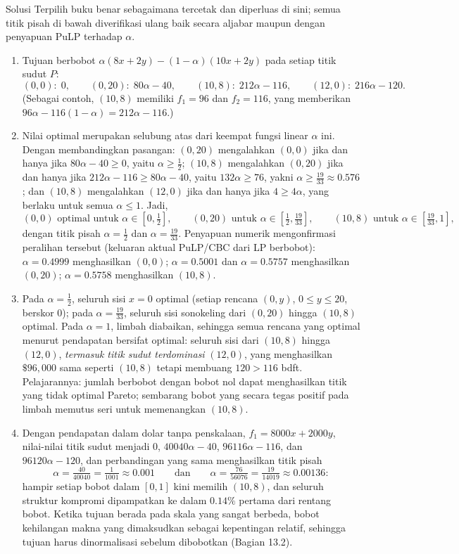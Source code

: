 Solusi Terpilih buku benar sebagaimana tercetak dan diperluas di sini;
semua titik pisah di bawah diverifikasi ulang baik secara aljabar maupun dengan
penyapuan PuLP terhadap $\alpha$.

\begin{enumerate}
\item Tujuan berbobot
$\alpha(8x + 2y) - (1-\alpha)(10x + 2y)$ pada setiap titik sudut $P$:
\[
(0,0): \; 0, \qquad
(0,20): \; 80\alpha - 40, \qquad
(10,8): \; 212\alpha - 116, \qquad
(12,0): \; 216\alpha - 120.
\]
(Sebagai contoh, $(10,8)$ memiliki $f_1 = 96$ dan $f_2 = 116$, yang memberikan
$96\alpha - 116(1 - \alpha) = 212\alpha - 116$.)
\item Nilai optimal merupakan selubung atas dari keempat fungsi linear
$\alpha$ ini. Dengan membandingkan pasangan: $(0,20)$ mengalahkan $(0,0)$ jika
dan hanya jika $80\alpha - 40 \geq 0$, yaitu $\alpha \geq \tfrac12$; $(10,8)$
mengalahkan $(0,20)$ jika dan hanya jika
$212\alpha - 116 \geq 80\alpha - 40$, yaitu $132\alpha \geq 76$, yakni
$\alpha \geq \tfrac{19}{33} \approx 0.576$; dan $(10,8)$ mengalahkan $(12,0)$
jika dan hanya jika $4 \geq 4\alpha$, yang berlaku untuk semua
$\alpha \leq 1$. Jadi,
\[
(0,0) \text{ optimal untuk } \alpha \in [0, \tfrac12], \qquad
(0,20) \text{ untuk } \alpha \in [\tfrac12, \tfrac{19}{33}], \qquad
(10,8) \text{ untuk } \alpha \in [\tfrac{19}{33}, 1],
\]
dengan titik pisah $\alpha = \tfrac12$ dan $\alpha = \tfrac{19}{33}$.
Penyapuan numerik mengonfirmasi peralihan tersebut (keluaran aktual PuLP/CBC
dari LP berbobot): $\alpha = 0.4999$ menghasilkan $(0,0)$;
$\alpha = 0.5001$ dan $\alpha = 0.5757$ menghasilkan $(0,20)$;
$\alpha = 0.5758$ menghasilkan $(10,8)$.
\item Pada $\alpha = \tfrac12$, seluruh sisi $x = 0$ optimal (setiap rencana
$(0, y)$, $0 \leq y \leq 20$, berskor $0$); pada
$\alpha = \tfrac{19}{33}$, seluruh sisi sonokeling dari $(0,20)$ hingga $(10,8)$
optimal. Pada $\alpha = 1$, limbah diabaikan, sehingga semua rencana yang
optimal menurut pendapatan bersifat optimal: seluruh sisi dari $(10,8)$ hingga
$(12,0)$, \emph{termasuk titik sudut terdominasi} $(12,0)$, yang menghasilkan
$\$96{,}000$ sama seperti $(10,8)$ tetapi membuang $120 > 116$ bdft. Pelajarannya:
jumlah berbobot dengan bobot nol dapat menghasilkan titik yang tidak optimal
Pareto; sembarang bobot yang secara tegas positif pada limbah memutus seri
untuk memenangkan $(10,8)$.
\item Dengan pendapatan dalam dolar tanpa penskalaan,
$f_1 = 8000x + 2000y$, nilai-nilai titik sudut menjadi $0$,
$40040\alpha - 40$, $96116\alpha - 116$, dan $96120\alpha - 120$, dan
perbandingan yang sama menghasilkan titik pisah
\[
\alpha = \tfrac{40}{40040} = \tfrac{1}{1001} \approx 0.001
\qquad\text{dan}\qquad
\alpha = \tfrac{76}{56076} = \tfrac{19}{14019} \approx 0.00136 :
\]
hampir setiap bobot dalam $[0,1]$ kini memilih $(10,8)$, dan seluruh struktur
kompromi dipampatkan ke dalam $0.14\%$ pertama dari rentang bobot. Ketika tujuan
berada pada skala yang sangat berbeda, bobot kehilangan makna yang dimaksudkan
sebagai kepentingan relatif, sehingga tujuan harus dinormalisasi sebelum
dibobotkan (Bagian 13.2).
\end{enumerate}
